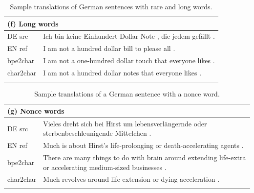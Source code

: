 \documentclass[11pt,letterpaper]{article}
\newcommand{\tb}{\textbf}
\newcommand{\clr}{\color{Red}}
\begin{document}
\begin{table}[t]
\begin{tabular}{p{1.4cm}|p{14.6cm}}
\multicolumn{2}{l}{\tb{(f) Long words}} \\ \hline \hline
DE src  & Ich bin keine {\clr Einhundert-Dollar-Note} , die jedem gef\"allt . \\ \hline
EN ref  & I am not a {\clr hundred dollar bill} to please all . \\ \hline
bpe2char &  I am not a {\clr one-hundred dollar touch} that everyone likes . \\ \hline
char2char & I am not a {\clr hundred dollar notes} that everyone likes . \\ \hline
\multicolumn{2}{l}{}       \\

\end{tabular}
\vspace{-8mm}
\caption{Sample translations of German sentences with rare and long words.}
\label{table:rare}
\normalsize
\end{table}


\begin{table}[t]
\footnotesize
\centering
\begin{tabular}{p{1.4cm}|p{14.6cm}}

\multicolumn{2}{l}{\tb{(g) Nonce words}} \\ \hline \hline
DE src  & Vieles dreht sich bei Hirst um lebensverl\"angernde oder {\clr sterbenbeschleunigende} Mittelchen . \\ \hline
EN ref  &  Much is about Hirst's life-prolonging or {\clr death-accelerating} agents .\\ \hline
bpe2char &  There are many things to do with brain around extending life-extra or {\clr accelerating} medium-sized businesses . \\ \hline
char2char & Much revolves around life extension or {\clr dying acceleration} . \\ \hline
\multicolumn{2}{l}{}       \\

\end{tabular}
\vspace{-8mm}
\caption{Sample translations of a German sentence with a nonce word.}
\label{table:nonce}
\normalsize
\end{table}
\end{document}

